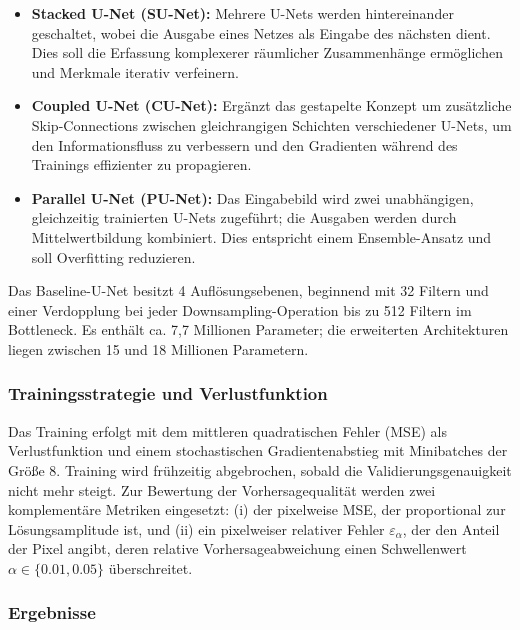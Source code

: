 \documentclass[a4paper,12pt]{article}
\begin{document}
\begin{itemize}
    \item \textbf{Stacked U-Net (SU-Net):} Mehrere U-Nets werden hintereinander geschaltet, wobei die Ausgabe eines Netzes als Eingabe des nächsten dient. Dies soll die Erfassung komplexerer räumlicher Zusammenhänge ermöglichen und Merkmale iterativ verfeinern.
    \item \textbf{Coupled U-Net (CU-Net):} Ergänzt das gestapelte Konzept um zusätzliche Skip-Connections zwischen gleichrangigen Schichten verschiedener U-Nets, um den Informationsfluss zu verbessern und den Gradienten während des Trainings effizienter zu propagieren.
    \item \textbf{Parallel U-Net (PU-Net):} Das Eingabebild wird zwei unabhängigen, gleichzeitig trainierten U-Nets zugeführt; die Ausgaben werden durch Mittelwertbildung kombiniert. Dies entspricht einem Ensemble-Ansatz und soll Overfitting reduzieren.
\end{itemize}

Das Baseline-U-Net besitzt 4 Auflösungsebenen, beginnend mit 32 Filtern und einer Verdopplung bei jeder Downsampling-Operation bis zu 512 Filtern im Bottleneck. Es enthält ca. 7,7 Millionen Parameter; die erweiterten Architekturen liegen zwischen 15 und 18 Millionen Parametern.

\subsubsection*{Trainingsstrategie und Verlustfunktion}

Das Training erfolgt mit dem mittleren quadratischen Fehler (MSE) als Verlustfunktion und einem stochastischen Gradientenabstieg mit Minibatches der Größe 8. Training wird frühzeitig abgebrochen, sobald die Validierungsgenauigkeit nicht mehr steigt. Zur Bewertung der Vorhersagequalität werden zwei komplementäre Metriken eingesetzt: (i) der pixelweise MSE, der proportional zur Lösungsamplitude ist, und (ii) ein pixelweiser relativer Fehler $\varepsilon_\alpha$, der den Anteil der Pixel angibt, deren relative Vorhersageabweichung einen Schwellenwert $\alpha \in \{0.01, 0.05\}$ überschreitet.

\subsubsection*{Ergebnisse}
\end{document}
